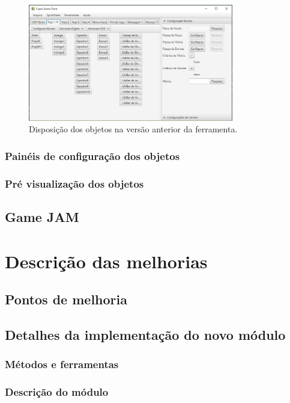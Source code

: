 \documentclass[12pt,twoside,openright,a4paper,english,brazil,sumario=tradicional]{abntex2}
\begin{document}
\begin{figure}[h]
\label{fig:objetos_disp}
\centering
\includegraphics[width=0.8\textwidth]{images/objetos_disposicao.jpg}
\caption{Disposição dos objetos na versão anterior da ferramenta.}
\end{figure}


\subsection{Painéis de configuração dos objetos}
\subsection{Pré visualização dos objetos}

\section{Game JAM} %

\chapter{Descrição das melhorias} %
\label{chap:melhorias}
\section{Pontos de melhoria}
\section{Detalhes da implementação do novo módulo}
\subsection{Métodos e ferramentas}
\subsection{Descrição do módulo}
\end{document}
